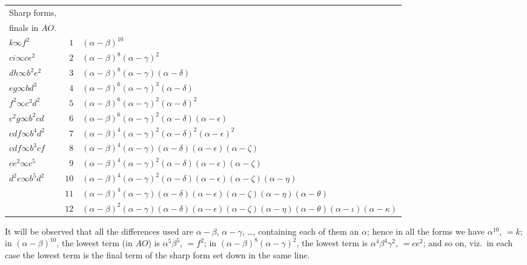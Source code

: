 \documentclass[11pt]{article}
\begin{document}
\begin{center}
\begin{tabular}{l|rl}
\multicolumn{1}{l|}{Sharp forms,} & \multicolumn{2}{l}{} \\
\multicolumn{1}{l|}{finals in $AO$.} & & \\
\hline
$k \infty f^2$              & $1$  & $(\alpha - \beta)^{10}$ \\
$ci \infty ce^2$            & $2$  & $(\alpha - \beta)^8 (\alpha - \gamma)^2$ \\
$dh \infty b^2e^2$          & $3$  & $(\alpha - \beta)^8 (\alpha - \gamma)(\alpha - \delta)$ \\
$eg \infty bd^3$            & $4$  & $(\alpha - \beta)^6 (\alpha - \gamma)^3 (\alpha - \delta)$ \\
$f^2 \infty c^3d^2$         & $5$  & $(\alpha - \beta)^6 (\alpha - \gamma)^2 (\alpha - \delta)^2$ \\
$c^2g \infty b^2cd$         & $6$  & $(\alpha - \beta)^6 (\alpha - \gamma)^2 (\alpha - \delta)(\alpha - \epsilon)$ \\
$cdf \infty b^4d^2$         & $7$  & $(\alpha - \beta)^4 (\alpha - \gamma)^2 (\alpha - \delta)^2 (\alpha - \epsilon)^2$ \\
$cdf \infty b^3cf$          & $8$  & $(\alpha - \beta)^4 (\alpha - \gamma)(\alpha - \delta)(\alpha - \epsilon)(\alpha - \zeta)$ \\
$ce^2 \infty c^5$           & $9$  & $(\alpha - \beta)^4 (\alpha - \gamma)^2 (\alpha - \delta)(\alpha - \epsilon)(\alpha - \zeta)$ \\
$d^2e \infty b^5d^2$        & $10$ & $(\alpha - \beta)^4 (\alpha - \gamma)^2 (\alpha - \delta)(\alpha - \epsilon)(\alpha - \zeta)(\alpha - \eta)$ \\
                            & $11$ & $(\alpha - \beta)^4 (\alpha - \gamma)(\alpha - \delta)(\alpha - \epsilon)(\alpha - \zeta)(\alpha - \eta)(\alpha - \theta)$ \\
                            & $12$ & $(\alpha - \beta)^2 (\alpha - \gamma)(\alpha - \delta)(\alpha - \epsilon)(\alpha - \zeta)(\alpha - \eta)(\alpha - \theta)(\alpha - \iota)(\alpha - \kappa)$ \\
\end{tabular}
\end{center}

It will be observed that all the differences used are $\alpha - \beta$, $\alpha - \gamma$, \ldots, containing each of them an $\alpha$; hence in all the forms we have $\alpha^{10}$, $= k$; in $(\alpha - \beta)^{10}$, the lowest term (in $AO$) is $\alpha^5\beta^5$, $= f^2$; in $(\alpha - \beta)^8 (\alpha - \gamma)^2$, the lowest term is $\alpha^4\beta^4\gamma^2$, $= ce^2$; and so on, viz.\ in each case the lowest term is the final term of the sharp form set down in the same line.
\end{document}
